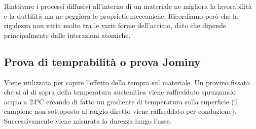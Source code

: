 Riattivare i processi diffusivi all'interno di un materiale ne migliora la lavorabilità e la duttilità ma ne peggiora le proprietà meccaniche. Ricordiamo però che la rigidezza non varia molto tra le varie forme dell'acciaio, dato che dipende principalmente dalle interazioni atomiche.

\subsection{Prova di temprabilità o prova Jominy}

Viene utilizzata per capire l'effetto della tempra sul materiale. Un provino fissato che si al di sopra della temperatura austenitica viene raffreddato spruzzando acqua a 24°C creando di fatto un gradiente di temperatura sulla superficie (il campione non sottoposto al raggio diretto viene raffreddato per conduzione). Successivamente viene misurata la durezza lungo l'asse.

